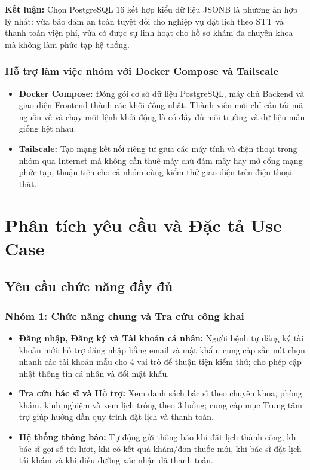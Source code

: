\documentclass[12pt,a4paper]{report}
\begin{document}
\textbf{Kết luận:} Chọn PostgreSQL 16 kết hợp kiểu dữ liệu JSONB là phương án hợp lý nhất: vừa bảo đảm an toàn tuyệt đối cho nghiệp vụ đặt lịch theo STT và thanh toán viện phí, vừa có được sự linh hoạt cho hồ sơ khám đa chuyên khoa mà không làm phức tạp hệ thống.

\subsection{Hỗ trợ làm việc nhóm với Docker Compose và Tailscale}
\begin{itemize}
  \item \textbf{Docker Compose:} Đóng gói cơ sở dữ liệu PostgreSQL, máy chủ Backend và giao diện Frontend thành các khối đồng nhất. Thành viên mới chỉ cần tải mã nguồn về và chạy một lệnh khởi động là có đầy đủ môi trường và dữ liệu mẫu giống hệt nhau.
  \item \textbf{Tailscale:} Tạo mạng kết nối riêng tư giữa các máy tính và điện thoại trong nhóm qua Internet mà không cần thuê máy chủ đám mây hay mở cổng mạng phức tạp, thuận tiện cho cả nhóm cùng kiểm thử giao diện trên điện thoại thật.
\end{itemize}

\chapter{Phân tích yêu cầu và Đặc tả Use Case}

\section{Yêu cầu chức năng đầy đủ}

\subsection{Nhóm 1: Chức năng chung và Tra cứu công khai}
\begin{itemize}
  \item \textbf{Đăng nhập, Đăng ký và Tài khoản cá nhân:} Người bệnh tự đăng ký tài khoản mới; hỗ trợ đăng nhập bằng email và mật khẩu; cung cấp sẵn nút chọn nhanh các tài khoản mẫu cho 4 vai trò để thuận tiện kiểm thử; cho phép cập nhật thông tin cá nhân và đổi mật khẩu.
  \item \textbf{Tra cứu bác sĩ và Hỗ trợ:} Xem danh sách bác sĩ theo chuyên khoa, phòng khám, kinh nghiệm và xem lịch trống theo 3 luồng; cung cấp mục Trung tâm trợ giúp hướng dẫn quy trình đặt lịch và thanh toán.
  \item \textbf{Hệ thống thông báo:} Tự động gửi thông báo khi đặt lịch thành công, khi bác sĩ gọi số tới lượt, khi có kết quả khám/đơn thuốc mới, khi bác sĩ đặt lịch tái khám và khi điều dưỡng xác nhận đã thanh toán.
\end{itemize}
\end{document}

